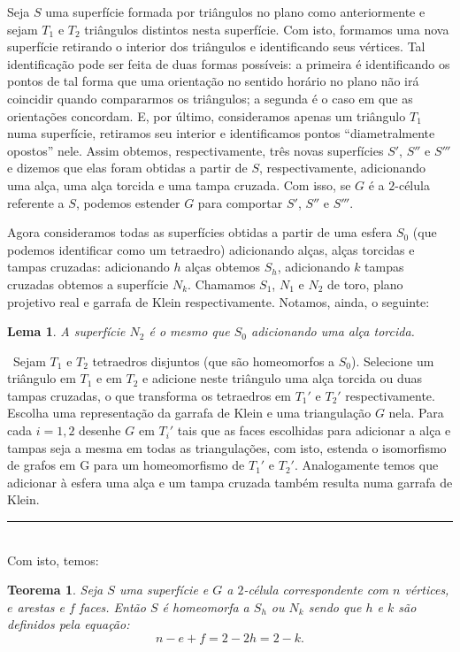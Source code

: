 \documentclass[12pt,a4paper]{article}
\newtheorem{lem}[mydef]{Lema}
\newtheorem{thrm}[mydef]{Teorema}
\def\dem{\par\smallbreak\noindent {\textit{ Demonstração:}} \ }
\def\eop{\hfill\rule{2.5mm}{2.5mm} \\ }
\theoremstyle{definition}
\begin{document}
Seja $S$ uma superfície formada por triângulos no plano como anteriormente e sejam $T_1$ e $T_2$ triângulos distintos nesta superfície. Com isto, formamos uma nova superfície retirando o interior dos triângulos e identificando seus vértices. Tal identificação pode ser feita de duas formas possíveis: a primeira é identificando os pontos de tal forma que uma orientação no sentido horário no plano não irá coincidir quando compararmos os triângulos; a segunda é o caso em que as orientações concordam. E, por último, consideramos apenas um triângulo $T_1$ numa superfície, retiramos seu interior e identificamos pontos ``diametralmente opostos'' nele. Assim obtemos, respectivamente, três novas superfícies $S'$, $S''$ e $S'''$ e dizemos que elas foram obtidas a partir de $S$, respectivamente, adicionando uma alça, uma alça torcida e uma tampa cruzada. Com isso, se $G$ é a $2$-célula referente a $S$, podemos estender $G$ para comportar $S'$, $S''$ e $S'''$.

Agora consideramos todas as superfícies obtidas a partir de uma esfera $S_0$ (que podemos identificar como um tetraedro) adicionando alças, alças torcidas e tampas cruzadas: adicionando $h$ alças obtemos $S_h$, adicionando $k$ tampas cruzadas obtemos a superfície $N_k$. Chamamos $S_1$, $N_1$ e $N_2$ de toro, plano projetivo real e garrafa de Klein respectivamente. Notamos, ainda, o seguinte: 

\begin{lem}

    A superfície $N_2$ é o mesmo que $S_0$ adicionando uma alça torcida.

\end{lem}

\dem Sejam $T_1$ e $T_2$ tetraedros disjuntos (que são homeomorfos a $S_0$). Selecione um triângulo em $T_1$ e em $T_2$ e adicione neste triângulo uma alça torcida ou duas tampas cruzadas, o que transforma os tetraedros em $T_1'$ e $T_2'$ respectivamente. Escolha uma representação da garrafa de Klein e uma triangulação $G$ nela. Para cada $i=1,2$ desenhe $G$ em $T_i'$ tais que as faces escolhidas para adicionar a alça e tampas seja a mesma em todas as triangulações, com isto, estenda o isomorfismo de grafos em G para um homeomorfismo de $T_1'$ e $T_2'$. Analogamente temos que adicionar à esfera uma alça e um tampa cruzada também resulta numa garrafa de Klein. \eop

Com isto, temos:

\begin{thrm}
  
    Seja $S$ uma superfície e $G$ a $2$-célula correspondente com $n$ vértices, $e$ arestas e $f$ faces. Então $S$ é homeomorfa a $S_h$ ou $N_k$ sendo que $h$ e $k$ são definidos pela equação: $$n-e+f = 2-2h = 2-k.$$
  
\end{thrm}
\end{document}
